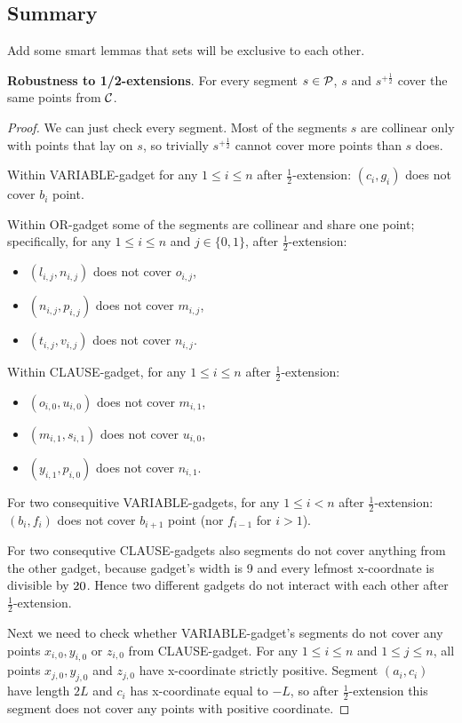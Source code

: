 \subsection{Summary}

Add some smart lemmas that sets will be exclusive to each other.

\begin{lemma}
\textbf{Robustness to 1/2-extensions}. For every segment $s \in \mathcal{P}$,
$s$ and $s^{+\frac{1}{2}}$ cover the same points from $\mathcal{C}$.
\end{lemma}

\begin{proof}
We can just check every segment. Most of the segments $s$
are collinear only with points that lay on $s$,
so trivially $s^{+\frac{1}{2}}$ cannot cover more points than $s$ does.

Within VARIABLE-gadget for any $1 \le i \le n$ after $\frac{1}{2}$-extension:
$(c_i,g_i)$ does not cover $b_i$ point.

Within OR-gadget some of the segments are collinear and share one point;
specifically, for any $1 \le i \le n$ and $j \in \{0,1\}$, after $\frac{1}{2}$-extension:
\begin{itemize}
\item $(l_{i,j}, n_{i,j})$ does not cover $o_{i,j}$,
\item $(n_{i,j}, p_{i,j})$ does not cover $m_{i,j}$,
\item $(t_{i,j}, v_{i,j})$ does not cover $n_{i,j}$.
\end{itemize}

Within CLAUSE-gadget, for any $1 \le i \le n$ after $\frac{1}{2}$-extension:
\begin{itemize}
\item $(o_{i,0}, u_{i,0})$ does not cover $m_{i,1}$,
\item $(m_{i,1}, s_{i,1})$ does not cover $u_{i,0}$,
\item $(y_{i,1}, p_{i,0})$ does not cover $n_{i,1}$.
\end{itemize}

For two consequitive VARIABLE-gadgets, for any $1 \le i < n$ after $\frac{1}{2}$-extension:
$(b_i, f_i)$ does not cover $b_{i+1}$ point (nor $f_{i-1}$ for $i>1$).

For two consequtive CLAUSE-gadgets also segments do not cover anything
from the other gadget, because gadget's width is 9 and
every lefmost x-coordnate is divisible by $20$.
Hence two different gadgets do not interact with each other
after $\frac{1}{2}$-extension.

Next we need to check whether VARIABLE-gadget's segments
do not cover any points $x_{i,0}, y_{i,0}$ or $z_{i,0}$ from CLAUSE-gadget.
For any $1 \le i \le n$ and $1 \le j \le n$, all points $x_{j,0}, y_{j,0}$ and $z_{j,0}$
have x-coordinate strictly positive. Segment $(a_i, c_i)$ have length $2L$
and $c_i$ has x-coordinate equal to $-L$, so after $\frac{1}{2}$-extension
this segment does not cover any points with positive coordinate.


\end{proof}


